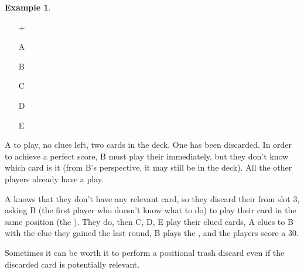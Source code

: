 \documentclass[a4paper]{article}
\theoremstyle{plain}
\theoremstyle{definition}
\newtheorem{example}[theorem]{Example}
\begin{document}
\begin{example}	\hfill \\
	\begin{minipage}{0.45\textwidth}
		\begin{itemize}
			\item[\Large +]      
			\item[\Large A]    
			\item[\Large B]    
			\item[\Large C]    
			\item[\Large D]    
			\item[\Large E]    
		\end{itemize}
	\end{minipage}%
	\begin{minipage}{0.55\textwidth}
		A to play, no clues left, two cards in the deck. One  has been discarded. In order to achieve a perfect score, B must play their  immediately, but they don't know which card is it (from B's perspective, it may still be in the deck). All the other players already have a play.
		
		A knows that they don't have any relevant card, so they discard their  from slot 3, asking B (the first player who doesn't know what to do) to play their card in the same position (the ). They do, then C, D, E play their clued cards, A clues  to B with the clue they gained the last round, B plays the , and the players score a 30.
	\end{minipage}
\end{example} \vspace{0.15 cm}

Sometimes it can be worth it to perform a positional trash discard even if the discarded card is potentially relevant.
\end{document}
